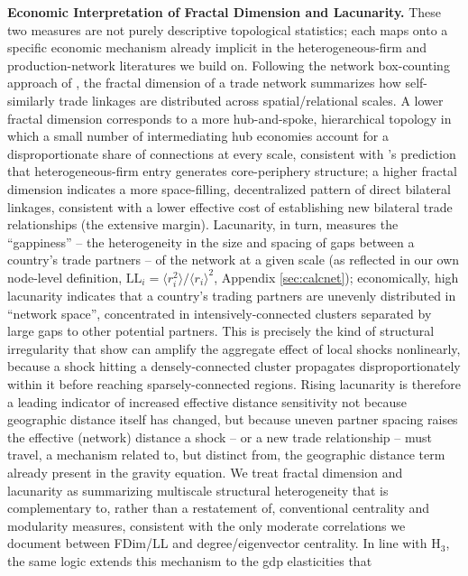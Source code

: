 \documentclass[preprint, 3p,
authoryear]{elsarticle} %
\begin{document}
\textbf{Economic Interpretation of Fractal Dimension and Lacunarity.}
These two measures are not purely descriptive topological statistics;
each maps onto a specific economic mechanism already implicit in the
heterogeneous-firm and production-network literatures we build on.
Following the network box-counting approach of
\citet{songhavlinmakse2005}, the fractal dimension of a trade network
summarizes how self-similarly trade linkages are distributed across
spatial/relational scales. A lower fractal dimension corresponds to a
more hub-and-spoke, hierarchical topology in which a small number of
intermediating hub economies account for a disproportionate share of
connections at every scale, consistent with \citet{chaney2014}'s
prediction that heterogeneous-firm entry generates core-periphery
structure; a higher fractal dimension indicates a more space-filling,
decentralized pattern of direct bilateral linkages, consistent with a
lower effective cost of establishing new bilateral trade relationships
(the extensive margin). Lacunarity, in turn, measures the ``gappiness''
-- the heterogeneity in the size and spacing of gaps between a country's
trade partners -- of the network at a given scale (as reflected in our
own node-level definition,
\(\text{LL}_i = \langle r_i^2\rangle/\langle r_i\rangle^2\), Appendix
\ref{sec:calcnet}); economically, high lacunarity indicates that a
country's trading partners are unevenly distributed in ``network
space'', concentrated in intensively-connected clusters separated by
large gaps to other potential partners. This is precisely the kind of
structural irregularity that \citet{baqaee2019macroeconomic} show can
amplify the aggregate effect of local shocks nonlinearly, because a
shock hitting a densely-connected cluster propagates disproportionately
within it before reaching sparsely-connected regions. Rising lacunarity
is therefore a leading indicator of increased effective distance
sensitivity not because geographic distance itself has changed, but
because uneven partner spacing raises the effective (network) distance a
shock -- or a new trade relationship -- must travel, a mechanism related
to, but distinct from, the geographic distance term already present in
the gravity equation. We treat fractal dimension and lacunarity as
summarizing multiscale structural heterogeneity that is complementary
to, rather than a restatement of, conventional centrality and modularity
measures, consistent with the only moderate correlations we document
between FDim/LL and degree/eigenvector centrality. In line with H\(_3\),
the same logic extends this mechanism to the \gls{gdp} elasticities that
\end{document}
